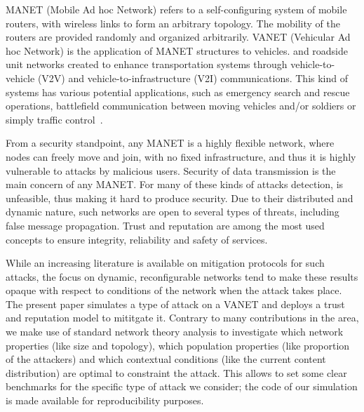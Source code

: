 \documentclass[compsoc, conference, letterpaper, 10pt, times]{IEEEtran}
\begin{document}
MANET (Mobile Ad hoc Network) refers to a self-configuring system of mobile routers, with wireless links to form an arbitrary topology. The mobility of the routers are provided randomly and organized arbitrarily. VANET (Vehicular Ad hoc Network) is the application of MANET structures to vehicles. and roadside unit networks created to enhance transportation systems through vehicle-to-vehicle (V2V) and vehicle-to-infrastructure (V2I) communications. This kind of systems has various potential applications, such as emergency search and rescue operations, battlefield
communication between moving vehicles and/or soldiers or simply traffic control~\cite{survey1,survey2}.

From a security standpoint, any MANET is a highly flexible network, where nodes can freely move and join, with no fixed infrastructure, and thus it is highly vulnerable to attacks by malicious users. Security of data transmission is the main concern of any MANET. For many of these kinds of attacks detection, is unfeasible, thus making it hard to produce security. Due to their distributed and dynamic nature, such networks are open to several types of threats, including false message propagation. Trust and reputation are among the  most used concepts to ensure integrity, reliability and safety of services.

While an increasing literature is available on mitigation protocols for such attacks, the focus on dynamic, reconfigurable networks tend to make these results opaque with respect to conditions of the network when the attack takes place. The present paper simulates a type of attack on a VANET and deploys a trust and reputation model to mititgate it. Contrary to many contributions in the area, we make use of standard network theory analysis to investigate which network properties (like size and topology), which population properties (like proportion of the attackers) and which contextual conditions (like the current content distribution) are optimal to constraint the attack. This allows to set some clear benchmarks for the specific type of attack we consider; the code of our simulation is made available for reproducibility purposes.
\end{document}
